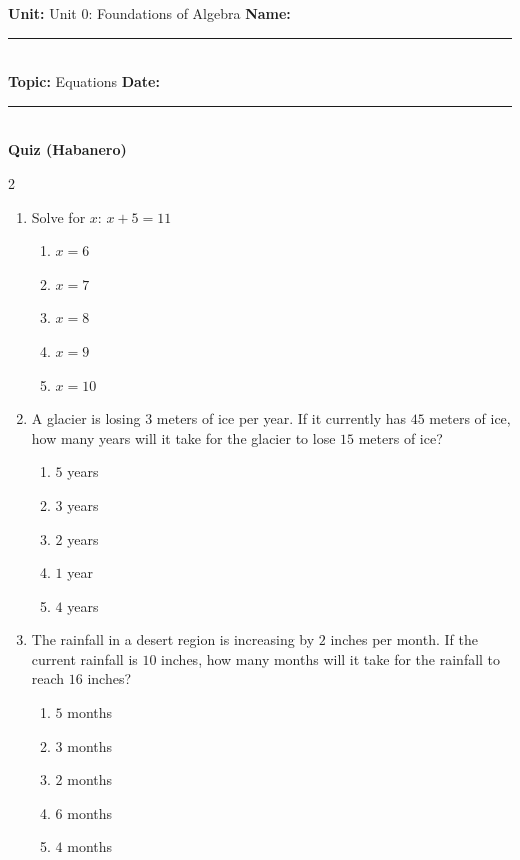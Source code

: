 \documentclass[10pt]{article}
\begin{document}
\enlargethispage{2.5cm}

\begin{tcolorbox}[colback=mainblue!5, colframe=mainblue, sharp corners, boxrule=0.5pt]
    \small \textbf{Unit:} Unit 0: Foundations of Algebra \hfill \textbf{Name:} \rule{3cm}{0.4pt} \\
    \small \textbf{Topic:} Equations \hfill \textbf{Date:} \rule{2cm}{0.4pt} \\
    \centering \textbf{\large Quiz (Habanero)}
\end{tcolorbox}

\vspace{0.2cm}

\begin{multicols}{2}
\begin{enumerate}[label=\textbf{Q\arabic*.}, leftmargin=*, itemsep=6pt, parsep=0pt]

  \item \small Solve for $x$: $x + 5 = 11$
  \begin{enumerate}[label=(\Alph*), leftmargin=0.6cm, nosep, itemsep=2pt]
    \item $x = 6$
    \item $x = 7$
    \item $x = 8$
    \item $x = 9$
    \item $x = 10$
  \end{enumerate}

  \item \small A glacier is losing $3$ meters of ice per year. If it currently has $45$ meters of ice, how many years will it take for the glacier to lose $15$ meters of ice?
  \begin{enumerate}[label=(\Alph*), leftmargin=0.6cm, nosep, itemsep=2pt]
    \item $5$ years
    \item $3$ years
    \item $2$ years
    \item $1$ year
    \item $4$ years
  \end{enumerate}

  \item \small The rainfall in a desert region is increasing by $2$ inches per month. If the current rainfall is $10$ inches, how many months will it take for the rainfall to reach $16$ inches?
  \begin{enumerate}[label=(\Alph*), leftmargin=0.6cm, nosep, itemsep=2pt]
    \item $5$ months
    \item $3$ months
    \item $2$ months
    \item $6$ months
    \item $4$ months
  \end{enumerate}


\end{enumerate}
\end{multicols}
\end{document}
